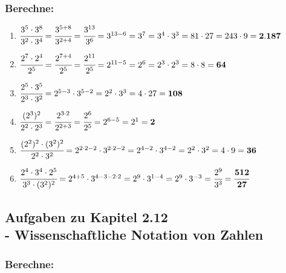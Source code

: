 \documentclass[a4paper,12pt]{article} %
\begin{document}
\subsubsection{Berechne:} %

\begin{enumerate}[label=\alph*)]

  \item \(\cfrac{3^5 \cdot 3^8}{3^2 \cdot 3^4} = \cfrac{3^{5 + 8}}{3^{2 + 4}} =
    \cfrac{3^{13}}{3^6} = 3^{13 - 6} = 3^7 = 3^4 \cdot 3^3 = 81 \cdot 27 = 243 \cdot 9 = \mathbf{2.187}\) %

  \item \(\cfrac{2^7 \cdot 2^4}{2^5} = \cfrac{2^{7 + 4}}{2^5} = \cfrac{2^{11}}{2^5} =
    2^{11 - 5} = 2^6 = 2^3 \cdot 2^3 = 8 \cdot 8 = \mathbf{64}\) %

  \item \(\cfrac{2^5 \cdot 3^5}{2^3 \cdot 3^2} = 2^{5 - 3} \cdot 3^{5 - 2} =
    2^2 \cdot 3^3 = 4 \cdot 27 = \mathbf{108}\) %

  \item \(\cfrac{(2^3)^2}{2^2 \cdot 2^3} = \cfrac{2^{3 \cdot 2}}{2^{2 + 3}} =
    \cfrac{2^6}{2^5} = 2^{6 - 5} = 2^1 = \mathbf{2}\) %

  \item \(\cfrac{(2^2)^2 \cdot (3^2)^2}{2^2 \cdot 3^2} = 2^{2 \cdot 2 - 2} \cdot 3^{2 \cdot 2 - 2} =
    2^{4 - 2} \cdot 3^{4 - 2} = 2^2 \cdot 3^2 = 4 \cdot 9 = \mathbf{36}\) %

  \item \(\cfrac{2^4 \cdot 3^4 \cdot 2^5}{3^3 \cdot (3^2)^2} = 2^{4 + 5} \cdot 3^{4 - 3 - 2 \cdot 2} =
    2^9 \cdot 3^{1 - 4} = 2^9 \cdot 3^{-3} = \cfrac{2^9}{3^3} = \mathbf{\cfrac{512}{27}}\) %

\end{enumerate}

\subsection{Aufgaben zu Kapitel 2.12 \\
  - Wissenschaftliche Notation von Zahlen}

\subsubsection{Berechne:} %
\end{document}
